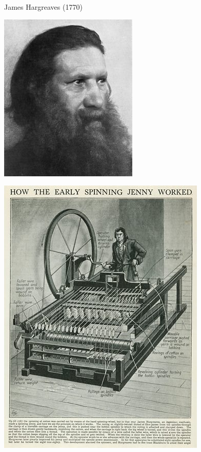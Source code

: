 \begin{multicols}{2}
	
	James Hargreaves (1770)
\begin{center}
	\includegraphics[height=.8\textheight]{./IMG/250px-James_Hargreaves.jpg}
\end{center}

\vfill
\columnbreak

\begin{center}
	\includegraphics[height=.9\textheight]{./IMG/M816020_How-the-Early-Spinning-Jenny-Worked.jpg}
\end{center}
\end{multicols}

